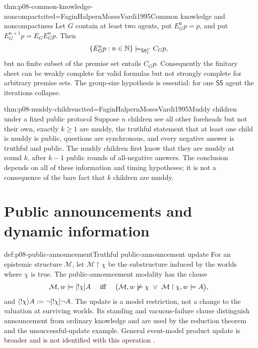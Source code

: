 \begin{hbtheorem}{thm:p08-common-knowledge-noncompact}{cited=FaginHalpernMosesVardi1995}{Common knowledge and noncompactness}
Let \(G\) contain at least two agents, put \(E_G^0p=p\), and put
\(E_G^{n+1}p=E_GE_G^np\).  Then
\[
 \{E_G^np:n\in\mathbb N\}\models_{\mathsf{S5}_{I}^{C}} C_Gp,
\]
but no finite subset of the premise set entails \(C_Gp\).  Consequently the
finitary sheet can be weakly complete for valid formulas but not strongly
complete for arbitrary premise sets.  The group-size hypothesis is essential:
for one \(\mathsf{S5}\) agent the iterations collapse.
\end{hbtheorem}

\begin{hbtheorem}{thm:p08-muddy-children}{cited=FaginHalpernMosesVardi1995}{Muddy children under a fixed public protocol}
Suppose \(n\) children see all other foreheads but not their own, exactly
\(k\ge1\) are muddy, the truthful statement that at least one child is muddy is
public, questions are synchronous, and every negative answer is truthful and
public.  The muddy children first know that they are muddy at round \(k\),
after \(k-1\) public rounds of all-negative answers.  The conclusion depends on
all of these information and timing hypotheses; it is not a consequence of the
bare fact that \(k\) children are muddy.
\end{hbtheorem}

\section[Public announcements]{Public announcements and dynamic information}

\begin{hbdefinition}{def:p08-public-announcement}{Truthful public-announcement update}
For an epistemic structure \(\mathcal M\), let
\(\mathcal M\mathbin{\upharpoonright}\chi\) be the substructure induced by the worlds where
\(\chi\) is true.  The public-announcement modality has the clause
\[
 \mathcal M,w\models[!\chi]A
 \quad\text{ iff }\quad
 \bigl(\mathcal M,w\not\models\chi\ \lor\
       \mathcal M\mathbin{\upharpoonright}\chi,w\models A\bigr),
\]
and \(\langle!\chi\rangle A\mathrel{:=}\neg[!\chi]\neg A\).  The update is a
model restriction, not a change to the valuation at surviving worlds.  Its
standing and vacuous-failure clause distinguish announcement from ordinary
knowledge and are used by the reduction theorem and the unsuccessful-update
example.  General event-model product update is broader and is not identified
with this operation \cite{Plaza1989,BaltagMossSolecki1998}.
\end{hbdefinition}

